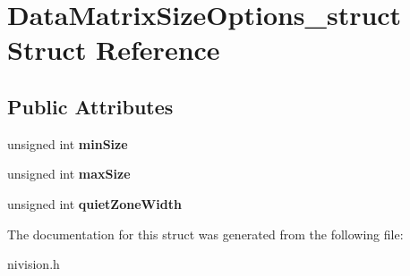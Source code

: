 \hypertarget{structDataMatrixSizeOptions__struct}{
\section{DataMatrixSizeOptions\_\-struct Struct Reference}
\label{structDataMatrixSizeOptions__struct}
}
\subsection*{Public Attributes}
\begin{DoxyCompactItemize}
\item 
\hypertarget{structDataMatrixSizeOptions__struct_a2c7f1a5e2e022fdd591cf0a43b48994e}{
unsigned int {\bfseries minSize}}
\label{structDataMatrixSizeOptions__struct_a2c7f1a5e2e022fdd591cf0a43b48994e}

\item 
\hypertarget{structDataMatrixSizeOptions__struct_a0297ba66a4dcb8d97866f67ec323d9e9}{
unsigned int {\bfseries maxSize}}
\label{structDataMatrixSizeOptions__struct_a0297ba66a4dcb8d97866f67ec323d9e9}

\item 
\hypertarget{structDataMatrixSizeOptions__struct_afa05c5ab0e032f0720e257a04a5cbacf}{
unsigned int {\bfseries quietZoneWidth}}
\label{structDataMatrixSizeOptions__struct_afa05c5ab0e032f0720e257a04a5cbacf}

\end{DoxyCompactItemize}


The documentation for this struct was generated from the following file:\begin{DoxyCompactItemize}
\item 
nivision.h\end{DoxyCompactItemize}
